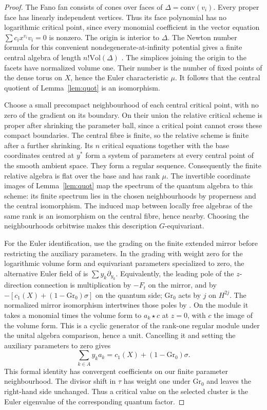 \begin{proof}
The Fano fan consists of cones over faces of $\Delta=\mathrm{conv}(v_i)$. Every proper face has linearly independent vertices. Thus its face polynomial has no logarithmic critical point, since every monomial coefficient in the vector equation $\sum c_i x^{v_i}v_i=0$ is nonzero. The origin is interior to $\Delta$. The Newton number formula for this convenient nondegenerate-at-infinity potential gives a finite central algebra of length $n!\mathrm{Vol}(\Delta)$ \cite[Lemma~2.8 and proof of Theorem~2.14]{RS}. The simplices joining the origin to the facets have normalized volume one. Their number is the number of fixed points of the dense torus on $X$, hence the Euler characteristic $\mu$. It follows that the central quotient of Lemma~\ref{lem:quot} is an isomorphism.

Choose a small precompact neighbourhood of each central critical point, with no zero of the gradient on its boundary. On their union the relative critical scheme is proper after shrinking the parameter ball, since a critical point cannot cross these compact boundaries. The central fibre is finite, so the relative scheme is finite after a further shrinking. Its $n$ critical equations together with the base coordinates centred at $y^*$ form a system of parameters at every central point of the smooth ambient space. They form a regular sequence. Consequently the finite relative algebra is flat over the base and has rank $\mu$. The invertible coordinate images of Lemma~\ref{lem:quot} map the spectrum of the quantum algebra to this scheme: its finite spectrum lies in the chosen neighbourhoods by properness and the central isomorphism. The induced map between locally free algebras of the same rank is an isomorphism on the central fibre, hence nearby. Choosing the neighbourhoods orbitwise makes this description $G$-equivariant.

For the Euler identification, use the grading on the finite extended mirror before restricting the auxiliary parameters. In the grading with weight zero for the logarithmic volume form and equivariant parameters specialized to zero, the alternative Euler field of \cite[Remark~4.12]{CCIT} is $\sum y_k\partial_{y_k}$. Equivalently, the leading pole of the $z$-direction connection is multiplication by $-F_t$ on the mirror, and by $-[c_1(X)+(1-\mathrm{Gr}_0)\sigma]$ on the quantum side; $\mathrm{Gr}_0$ acts by $j$ on $H^{2j}$. The normalized mirror isomorphism intertwines those poles by \cite[Theorem~4.28 and Remarks~3.2, 4.14]{CCIT}. On the module it takes a monomial times the volume form to $a_k\star c$ at $z=0$, with $c$ the image of the volume form. This is a cyclic generator of the rank-one regular module under the unital algebra comparison, hence a unit. Cancelling it and setting the auxiliary parameters to zero gives
\[
      \sum_{k\in A} y_k a_k=c_1(X)+(1-\mathrm{Gr}_0)\sigma .
\]
This formal identity has convergent coefficients on our finite parameter neighbourhood. The divisor shift in $\tau$ has weight one under $\mathrm{Gr}_0$ and leaves the right-hand side unchanged. Thus a critical value on the selected cluster is the Euler eigenvalue of the corresponding quantum factor.
\end{proof}
